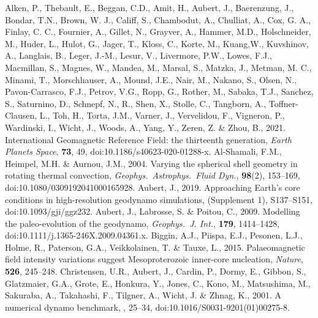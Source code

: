 \begin{thebibliography}{}
%
{\color{red}
Alken, P., Thebault, E., Beggan, C.D., Amit, H., Aubert, J., Baerenzung, J., Bondar, T.N., Brown, W. J., Califf, S., Chambodut, A., Chulliat, A., Cox, G. A., Finlay, C. C., Fournier, A., Gillet, N., Grayver, A., Hammer, M.D., Holschneider, M., Huder, L., Hulot, G., Jager, T., Kloss, C., Korte, M., Kuang,W., Kuvshinov, A., Langlais, B., Leger, J.-M., Lesur, V., Livermore, P.W., Lowes, F.J., Macmillan, S., Magnes, W., Mandea, M., Marsal, S., Matzka, J., Metman, M. C., Minami, T., Morschhauser, A., Mound, J.E., Nair, M., Nakano, S., Olsen, N., Pavon-Carrasco, F.J., Petrov, V.G., Ropp, G., Rother, M., Sabaka, T.J., Sanchez, S., Saturnino, D., Schnepf, N., R., Shen, X., Stolle, C., Tangborn, A., Toffner-Clausen, L., Toh, H., Torta, J.M., Varner, J., Vervelidou, F., Vigneron, P., Wardinski, I., Wicht, J., Woods, A., Yang, Y., Zeren, Z. \& Zhou, B., 2021. International Geomagnetic Reference Field: the thirteenth generation, {\it Earth Planets Space}, {\bf 73}, 49, doi:10.1186/s40623-020-01288-x.
}
%
Al-Shamali, F.M., Heimpel, M.H. \& Aurnou, J.M., 2004. Varying the spherical shell geometry in rotating thermal convection, {\it Geophys.\  Astrophys.\ Fluid Dyn.}, {\bf 98}(2), 153--169, doi:10.1080/0309192041000165928.
%
{\color{red}
Aubert, J., 2019. Approaching Earth's core conditions in high-resolution geodynamo simulations, (Supplement 1), S137--S151, doi:10.1093/gji/ggz232.
}
%
Aubert, J., Labrosse, S. \& Poitou, C., 2009. Modelling the paleo-evolution of the geodynamo, {\it Geophys.\ J. Int.}, {\bf 179}, 1414--1428, doi:10.1111/j.1365-246X.2009.04361.x.
%
Biggin, A.J., Piispa, E.J., Pesonen, L.J., Holme, R., Paterson, G.A., Veikkolainen, T. \& Tauxe, L., 2015. Palaeomagnetic field intensity variations suggest Mesoproterozoic inner-core nucleation, {\it Nature}, {\bf 526}, 245–248.
%
Christensen, U.R., Aubert, J., Cardin, P., Dormy, E., Gibbon, S., Glatzmaier, G.A., Grote, E., Honkura, Y., Jones, C., Kono, M., Matsushima, M., Sakuraba, A., Takahashi, F., Tilgner, A., Wicht, J. \& Zhnag, K., 2001. A numerical dynamo benchmark, , 25--34, doi:10.1016/S0031-9201(01)00275-8.

\end{thebibliography}
